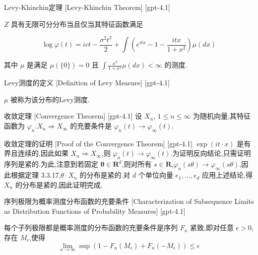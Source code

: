 \documentclass[UTF8]{ctexart}
\begin{document}
    
    
    \begin{thm}
        {Levy-Khinchin定理}
        [Levy-Khinchin Theorem]
        [gpt-4.1]
        
$Z$ 具有无限可分分布当且仅当其特征函数满足

\[
\log \varphi(t) = i c t - \frac{\sigma^{2} t^{2}}{2} + \int \left( e^{i t x} - 1 - \frac{i t x}{1 + x^{2}} \right) \mu(dx)
\]

其中 $\mu$ 是满足 $\mu(\{0\}) = 0$ 且 $\int \frac{x^{2}}{1 + x^{2}} \mu(dx) < \infty$ 的测度.

    \end{thm}
    
    
    
    \begin{dfn}
        {Levy测度的定义}
        [Definition of Levy Measure]
        [gpt-4.1]
        
$\mu$ 被称为该分布的Levy测度.

    \end{dfn}
    
    
    
    \begin{thm}
        {收敛定理}
        [Convergence Theorem]
        [gpt-4.1]
        设 $X_n$, $1 \leq n \leq \infty$ 为随机向量,其特征函数为 $\varphi_n$.$X_n \Rightarrow X_\infty$ 的充要条件是 $\varphi_n(t) \to \varphi_\infty(t)$.
    \end{thm}
    
    
    
    \begin{prf}
        {收敛定理的证明}
        [Proof of the Convergence Theorem]
        [gpt-4.1]
        $\exp(i t \cdot x)$ 是有界且连续的,因此如果 $X_n \Rightarrow X_\infty$,则 $\varphi_n(t) \to \varphi_\infty(t)$.为证明反向结论,只需证明序列是紧的.为此,注意到若固定 $\boldsymbol{\theta} \in \mathbf{R}^d$,则对所有 $s \in \mathbf{R}$,$\varphi_n(s\theta) \to \varphi_\infty(s\theta)$,因此根据定理 3.3.17,$\theta \cdot X_n$ 的分布是紧的.对 $d$ 个单位向量 $e_1, \ldots, e_d$ 应用上述结论,得 $X_n$ 的分布是紧的,因此证明完成.
    \end{prf}
    
    
    
    \begin{thm}
        {序列极限为概率测度分布函数的充要条件}
        [Characterization of Subsequence Limits as Distribution Functions of Probability Measures]
        [gpt-4.1]
        
每个子列极限都是概率测度的分布函数的充要条件是序列 $F_n$ 紧致,即对任意 $\epsilon > 0$,存在 $M_\epsilon$,使得
\[
\lim_{n \to \infty} \sup \left(1 - F_n(M_\epsilon) + F_n(-M_\epsilon)\right) \leq \epsilon
\]

    \end{thm}
    
\end{document}
